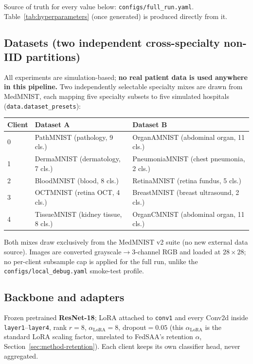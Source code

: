 \documentclass[11pt]{article}
\begin{document}
Source of truth for every value below: \texttt{configs/full\_run.yaml}. Table~\ref{tab:hyperparameters}
(once generated) is produced directly from it.

\subsection{Datasets (two independent cross-specialty non-IID partitions)}
All experiments are simulation-based; \textbf{no real patient data is used anywhere in this
pipeline.} Two independently selectable specialty mixes are drawn from MedMNIST, each mapping
five specialty subsets to five simulated hospitals (\texttt{data.dataset\_presets}):

\begin{table}[h]
\centering
\begin{tabular}{lll}
\toprule
Client & Dataset A & Dataset B \\
\midrule
0 & PathMNIST (pathology, 9 cls.) & OrganAMNIST (abdominal organ, 11 cls.) \\
1 & DermaMNIST (dermatology, 7 cls.) & PneumoniaMNIST (chest pneumonia, 2 cls.) \\
2 & BloodMNIST (blood, 8 cls.) & RetinaMNIST (retina fundus, 5 cls.) \\
3 & OCTMNIST (retina OCT, 4 cls.) & BreastMNIST (breast ultrasound, 2 cls.) \\
4 & TissueMNIST (kidney tissue, 8 cls.) & OrganCMNIST (abdominal organ, 11 cls.) \\
\bottomrule
\end{tabular}
\end{table}

Both mixes draw exclusively from the MedMNIST v2 suite (no new external data source). Images are
converted grayscale$\to$3-channel RGB and loaded at $28\times28$; no per-client subsample cap is
applied for the full run, unlike the \texttt{configs/local\_debug.yaml} smoke-test profile.

\subsection{Backbone and adapters}
Frozen pretrained \textbf{ResNet-18}; LoRA attached to \texttt{conv1} and every Conv2d inside
\texttt{layer1}--\texttt{layer4}, rank $r{=}8$, $\alpha_{\text{LoRA}}{=}8$, dropout$=0.05$ (this
$\alpha_{\text{LoRA}}$ is the standard LoRA scaling factor, unrelated to FedSAA's retention
$\alpha$, Section~\ref{sec:method-retention}). Each client keeps its own classifier head, never
aggregated.
\end{document}
